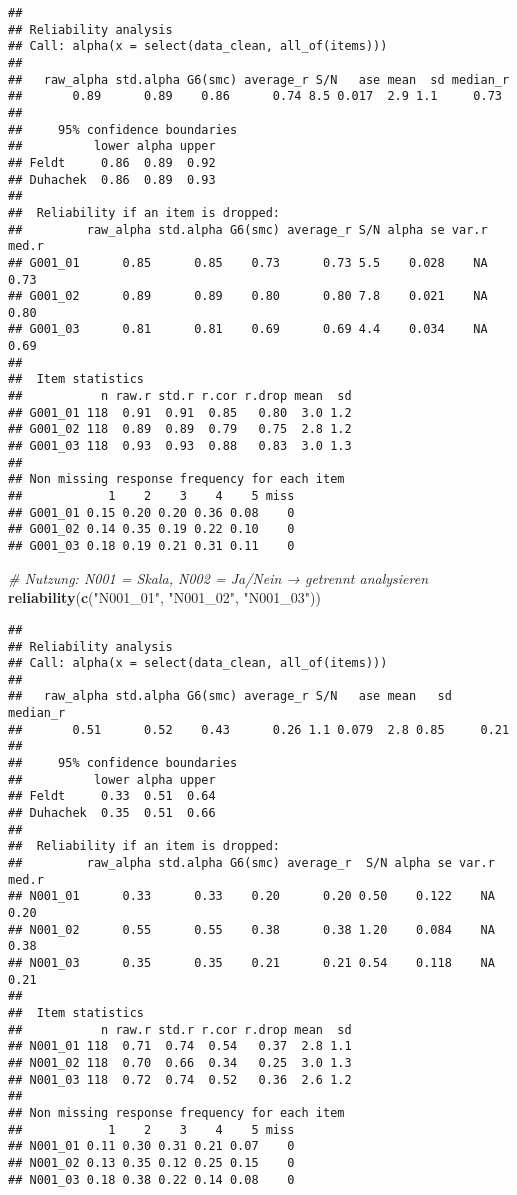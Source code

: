 \documentclass[
]{article}
\newenvironment{Shaded}{\begin{snugshade}}{\end{snugshade}}
\newcommand{\CommentTok}[1]{\textcolor[rgb]{0.56,0.35,0.01}{\textit{#1}}}
\newcommand{\FunctionTok}[1]{\textcolor[rgb]{0.13,0.29,0.53}{\textbf{#1}}}
\newcommand{\NormalTok}[1]{#1}
\newcommand{\StringTok}[1]{\textcolor[rgb]{0.31,0.60,0.02}{#1}}
\begin{document}
\begin{verbatim}
## 
## Reliability analysis   
## Call: alpha(x = select(data_clean, all_of(items)))
## 
##   raw_alpha std.alpha G6(smc) average_r S/N   ase mean  sd median_r
##       0.89      0.89    0.86      0.74 8.5 0.017  2.9 1.1     0.73
## 
##     95% confidence boundaries 
##          lower alpha upper
## Feldt     0.86  0.89  0.92
## Duhachek  0.86  0.89  0.93
## 
##  Reliability if an item is dropped:
##         raw_alpha std.alpha G6(smc) average_r S/N alpha se var.r med.r
## G001_01      0.85      0.85    0.73      0.73 5.5    0.028    NA  0.73
## G001_02      0.89      0.89    0.80      0.80 7.8    0.021    NA  0.80
## G001_03      0.81      0.81    0.69      0.69 4.4    0.034    NA  0.69
## 
##  Item statistics 
##           n raw.r std.r r.cor r.drop mean  sd
## G001_01 118  0.91  0.91  0.85   0.80  3.0 1.2
## G001_02 118  0.89  0.89  0.79   0.75  2.8 1.2
## G001_03 118  0.93  0.93  0.88   0.83  3.0 1.3
## 
## Non missing response frequency for each item
##            1    2    3    4    5 miss
## G001_01 0.15 0.20 0.20 0.36 0.08    0
## G001_02 0.14 0.35 0.19 0.22 0.10    0
## G001_03 0.18 0.19 0.21 0.31 0.11    0
\end{verbatim}

\begin{Shaded}
\begin{Highlighting}[]
\CommentTok{\# Nutzung: N001 = Skala, N002 = Ja/Nein → getrennt analysieren}
\FunctionTok{reliability}\NormalTok{(}\FunctionTok{c}\NormalTok{(}\StringTok{"N001\_01"}\NormalTok{, }\StringTok{"N001\_02"}\NormalTok{, }\StringTok{"N001\_03"}\NormalTok{))}
\end{Highlighting}
\end{Shaded}

\begin{verbatim}
## 
## Reliability analysis   
## Call: alpha(x = select(data_clean, all_of(items)))
## 
##   raw_alpha std.alpha G6(smc) average_r S/N   ase mean   sd median_r
##       0.51      0.52    0.43      0.26 1.1 0.079  2.8 0.85     0.21
## 
##     95% confidence boundaries 
##          lower alpha upper
## Feldt     0.33  0.51  0.64
## Duhachek  0.35  0.51  0.66
## 
##  Reliability if an item is dropped:
##         raw_alpha std.alpha G6(smc) average_r  S/N alpha se var.r med.r
## N001_01      0.33      0.33    0.20      0.20 0.50    0.122    NA  0.20
## N001_02      0.55      0.55    0.38      0.38 1.20    0.084    NA  0.38
## N001_03      0.35      0.35    0.21      0.21 0.54    0.118    NA  0.21
## 
##  Item statistics 
##           n raw.r std.r r.cor r.drop mean  sd
## N001_01 118  0.71  0.74  0.54   0.37  2.8 1.1
## N001_02 118  0.70  0.66  0.34   0.25  3.0 1.3
## N001_03 118  0.72  0.74  0.52   0.36  2.6 1.2
## 
## Non missing response frequency for each item
##            1    2    3    4    5 miss
## N001_01 0.11 0.30 0.31 0.21 0.07    0
## N001_02 0.13 0.35 0.12 0.25 0.15    0
## N001_03 0.18 0.38 0.22 0.14 0.08    0
\end{verbatim}
\end{document}
